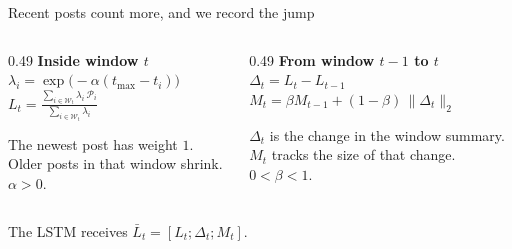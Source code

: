 \begin{frame}{Recent posts count more, and we record the jump}
  \begin{columns}[T,onlytextwidth]
    \begin{column}{0.49\textwidth}
      \centering
      \textbf{Inside window $t$}\\[0.55em]
      {\small $\displaystyle
        \lambda_i=\exp\!\bigl(-\alpha(t_{\max}-t_i)\bigr)
      $}\\[0.7em]
      {\small $\displaystyle
        L_t
        = \frac{\sum_{i\in\mathcal{W}_t}\lambda_i\,\mathcal{P}_i}
               {\sum_{i\in\mathcal{W}_t}\lambda_i}
      $}\\[0.65em]
      \parbox{0.46\textwidth}{\raggedright\small The newest post has weight $1$. Older posts in that window shrink. $\alpha>0$.}
    \end{column}
    \begin{column}{0.49\textwidth}
      \centering
      \textbf{From window $t-1$ to $t$}\\[0.55em]
      {\small $\displaystyle \Delta_t = L_t-L_{t-1}$}\\[0.85em]
      {\small $\displaystyle
        M_t = \beta M_{t-1}+(1-\beta)\,\|\Delta_t\|_2
      $}\\[0.7em]
      \parbox{0.46\textwidth}{\raggedright\small $\Delta_t$ is the change in the window summary. $M_t$ tracks the size of that change. $0<\beta<1$.}
    \end{column}
  \end{columns}
  \vspace{0.7em}
  The LSTM receives $\bar L_t=[L_t;\Delta_t;M_t]$.
\end{frame}

